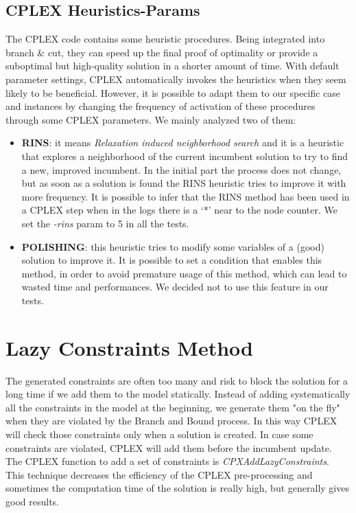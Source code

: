 \subsection{CPLEX Heuristics-Params}
The \textsc{CPLEX} code contains some heuristic procedures. Being integrated into branch \& cut, they can speed up the final proof of optimality or provide a suboptimal but high-quality solution in a shorter amount of time. With default parameter settings, \textsc{CPLEX} automatically invokes the heuristics when they seem likely to be beneficial. However, it is possible to adapt them to our specific case and instances by changing the frequency of activation of these procedures through some \textsc{CPLEX} parameters. We mainly analyzed two of them:
\begin{itemize}
\setlength{\parskip}{0pt}
\setlength{\itemsep}{0pt plus 1pt}
\item \textbf{RINS}: it means \textit{Relaxation induced neighborhood search} and it is a heuristic that explores a neighborhood of the current incumbent solution to try to find a new, improved incumbent. In the initial part the process does not change, but as soon as a solution is found the RINS heuristic tries to improve it with more frequency. It is possible to infer that the RINS method has been used in a \textsc{CPLEX} step when in the logs there is a ‘*’ near to the node counter. We set the \textit{-rins} param to 5 in all the tests. 
\item \textbf{POLISHING}: this heuristic tries to modify some variables of a (good) solution to improve it. It is possible to set a condition that enables this method, in order to avoid premature usage of this method, which can lead to wasted time and performances. We decided not to use this feature in our tests.
\end{itemize}

\section{Lazy Constraints Method}
The generated constraints are often too many and risk to block the solution for a long time if we add them to the model statically.  
Instead of adding systematically all the constraints in the model at the beginning, we generate them "on the fly" when they are violated by the Branch and Bound process. In this way \textsc{CPLEX} will check those constraints only when a solution is created. In case some constraints are violated, \textsc{CPLEX} will add them before the incumbent update. \\
The \textsc{CPLEX} function to add a set of constraints is \textit{CPXAddLazyConstraints}. \\
This technique decreases the efficiency of the \textsc{CPLEX} pre-processing and sometimes the computation time of the solution is really high, but generally gives good results.

